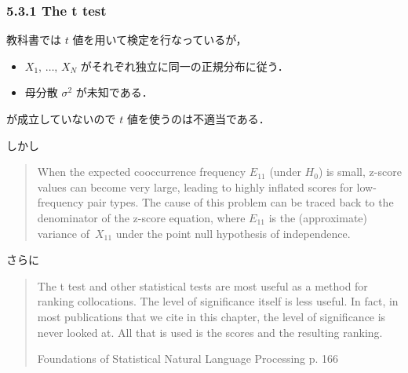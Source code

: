 \documentclass[9pt,leqno]{beamer}
\begin{document}
\begin{frame}
    \frametitle{5.3.1 The t test}
    教科書では $t$ 値を用いて検定を行なっているが，
    \begin{itemize}
        \item $X_1,\,\ldots,\,X_N$ がそれぞれ独立に同一の正規分布に従う．
        \item 母分散 $\sigma^2$ が未知である．
    \end{itemize}
    が成立していないので $t$ 値を使うのは不適当である．

    \smallskip
    
    しかし
    \begin{quote}
        When the expected cooccurrence frequency $E_{11}$ (under $H_0$) is small, z-score values can become very large,
        leading to highly inflated scores for low-frequency pair types.
        The cause of this problem can be traced back to the denominator of the z-score equation,
        where $E_{11}$ is the (approximate) variance of $\,X_{11}$ under the point null hypothesis of independence.    
        \begin{flushright}
        \end{flushright}
    \end{quote}

    さらに
    \begin{quote}
        The t test and other statistical tests are most useful as
        a method for ranking collocations. The level of significance itself is less
        useful. In fact, in most publications that we cite in this chapter, the level
        of significance is never looked at. All that is used is the scores and the
        resulting ranking.
        \begin{flushright}
            Foundations of Statistical Natural Language Processing p. 166
        \end{flushright}
    \end{quote}
\end{frame}
\end{document}
